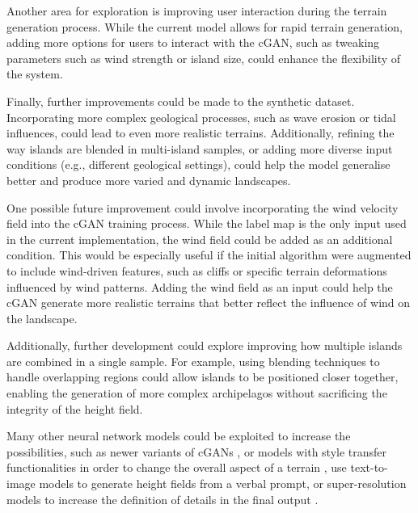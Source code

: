 Another area for exploration is improving user interaction during the terrain generation process. While the current model allows for rapid terrain generation, adding more options for users to interact with the cGAN, such as tweaking parameters such as wind strength or island size, could enhance the flexibility of the system.

Finally, further improvements could be made to the synthetic dataset. Incorporating more complex geological processes, such as wave erosion or tidal influences, could lead to even more realistic terrains. Additionally, refining the way islands are blended in multi-island samples, or adding more diverse input conditions (e.g., different geological settings), could help the model generalise better and produce more varied and dynamic landscapes.

One possible future improvement could involve incorporating the wind velocity field into the cGAN training process. While the label map is the only input used in the current implementation, the wind field could be added as an additional condition. This would be especially useful if the initial algorithm were augmented to include wind-driven features, such as cliffs or specific terrain deformations influenced by wind patterns. Adding the wind field as an input could help the cGAN generate more realistic terrains that better reflect the influence of wind on the landscape.

Additionally, further development could explore improving how multiple islands are combined in a single sample. For example, using blending techniques to handle overlapping regions could allow islands to be positioned closer together, enabling the generation of more complex archipelagos without sacrificing the integrity of the height field.

Many other neural network models could be exploited to increase the possibilities, such as newer variants of cGANs \cite{Park2019}, or models with style transfer functionalities \cite{Gatys2015,Zhu2020} in order to change the overall aspect of a terrain \cite{Perche2023a,Perche2023b}, use text-to-image models \cite{Rombach2021,Radford2021} to generate height fields from a verbal prompt, or super-resolution models \cite{Dong2014} to increase the definition of details in the final output \cite{Guerin2016a}.

